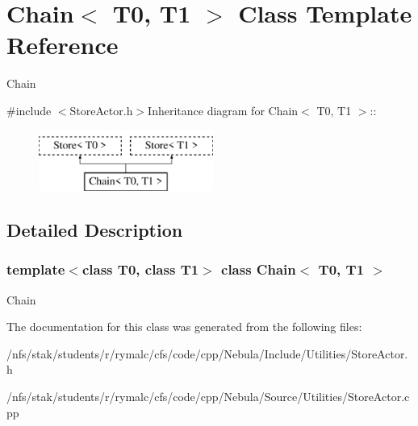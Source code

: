 \hypertarget{classChain}{
\section{Chain$<$ T0, T1 $>$ Class Template Reference}
\label{classChain}
}


Chain  


{\ttfamily \#include $<$StoreActor.h$>$}Inheritance diagram for Chain$<$ T0, T1 $>$::\begin{figure}[H]
\begin{center}
\leavevmode
\includegraphics[height=2cm]{classChain}
\end{center}
\end{figure}


\subsection{Detailed Description}
\subsubsection*{template$<$class T0, class T1$>$ class Chain$<$ T0, T1 $>$}

Chain 

The documentation for this class was generated from the following files:\begin{DoxyCompactItemize}
\item 
/nfs/stak/students/r/rymalc/cfs/code/cpp/Nebula/Include/Utilities/StoreActor.h\item 
/nfs/stak/students/r/rymalc/cfs/code/cpp/Nebula/Source/Utilities/StoreActor.cpp\end{DoxyCompactItemize}
